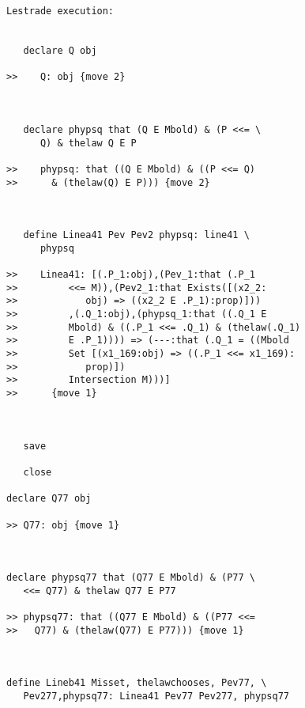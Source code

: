 \documentclass[12pt]{article}
\begin{document}
\begin{verbatim}Lestrade execution:


   declare Q obj

>>    Q: obj {move 2}



   declare phypsq that (Q E Mbold) & (P <<= \
      Q) & thelaw Q E P

>>    phypsq: that ((Q E Mbold) & ((P <<= Q)
>>      & (thelaw(Q) E P))) {move 2}



   define Linea41 Pev Pev2 phypsq: line41 \
      phypsq

>>    Linea41: [(.P_1:obj),(Pev_1:that (.P_1
>>         <<= M)),(Pev2_1:that Exists([(x2_2:
>>            obj) => ((x2_2 E .P_1):prop)]))
>>         ,(.Q_1:obj),(phypsq_1:that ((.Q_1 E
>>         Mbold) & ((.P_1 <<= .Q_1) & (thelaw(.Q_1)
>>         E .P_1)))) => (---:that (.Q_1 = ((Mbold
>>         Set [(x1_169:obj) => ((.P_1 <<= x1_169):
>>            prop)])
>>         Intersection M)))]
>>      {move 1}



   save

   close

declare Q77 obj

>> Q77: obj {move 1}



declare phypsq77 that (Q77 E Mbold) & (P77 \
   <<= Q77) & thelaw Q77 E P77

>> phypsq77: that ((Q77 E Mbold) & ((P77 <<=
>>   Q77) & (thelaw(Q77) E P77))) {move 1}



define Lineb41 Misset, thelawchooses, Pev77, \
   Pev277,phypsq77: Linea41 Pev77 Pev277, phypsq77



\end{verbatim}
\end{document}
